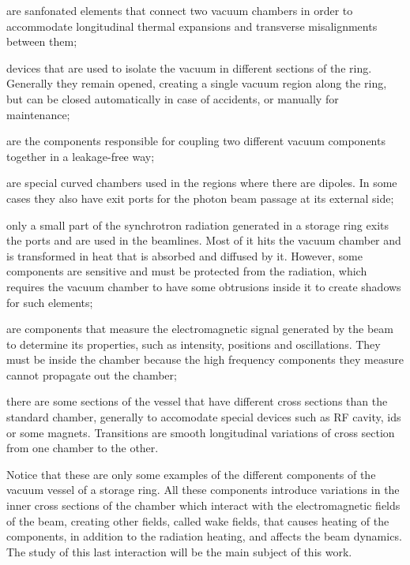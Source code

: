     \begin{description}[align=left]
        \item[Bellows:] are sanfonated elements that connect two vacuum chambers in order to accommodate longitudinal thermal expansions and transverse misalignments between them;
        \item[Valves:] devices that are used to isolate the vacuum in different sections of the ring. Generally they remain opened, creating a single vacuum region along the ring, but can be closed automatically in case of accidents, or manually for maintenance;
        \item[Flanges:] are the components responsible for coupling two different vacuum components together in a leakage-free way;
        \item[Dipole Chambers:] are special curved chambers used in the regions where there are dipoles. In some cases they also have exit ports for the photon beam passage at its external side;
        \item[Radiation Masks:] only a small part of the synchrotron radiation generated in a storage ring exits the ports and are used in the beamlines. Most of it hits the vacuum chamber and is transformed in heat that is absorbed and diffused by it. However, some components are sensitive and must be protected from the radiation, which requires the vacuum chamber to have some obtrusions inside it to create shadows for such elements;
        \item[Diagnostic:] are components that measure the electromagnetic signal generated by the beam to determine its properties, such as intensity, positions and oscillations. They must be inside the chamber because the high frequency components they measure cannot propagate out the chamber;
        \item[Transitions:] there are some sections of the vessel that have different cross sections than the standard chamber, generally to accomodate special devices such as RF cavity, \gls{ids} or some magnets. Transitions are smooth longitudinal variations of cross section from one chamber to the other.
    \end{description}

    Notice that these are only some examples of the different components of the vacuum vessel of a storage ring. All these components introduce variations in the inner cross sections of the chamber which interact with the electromagnetic fields of the beam, creating other fields, called wake fields, that causes heating of the components, in addition to the radiation heating, and affects the beam dynamics. The study of this last interaction will be the main subject of this work.

